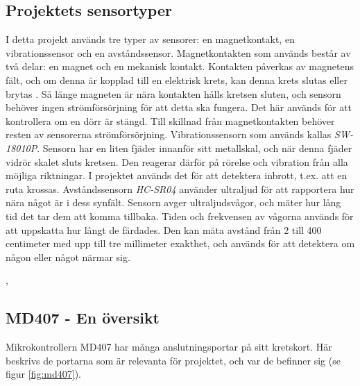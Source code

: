 \subsection{Projektets sensortyper}
\label{sec:sensortyper}
I detta projekt används tre typer av sensorer: en magnetkontakt, en vibrationssensor och en avståndssensor. Magnetkontakten som används består av två delar: en magnet och en mekanisk kontakt. Kontakten påverkas av magnetens fält, och om denna är kopplad till en elektrisk krets, kan denna krets slutas eller brytas \cite[s. 15]{lundh:2008}. Så länge magneten är nära kontakten hålls kretsen sluten, och sensorn behöver ingen strömförsörjning för att detta ska fungera. Det här används för att kontrollera om en dörr är stängd. 
\newline \newline
Till skillnad från magnetkontakten behöver resten av sensorerna strömförsörjning.
Vibrationssensorn som används kallas \textit{SW-18010P}. Sensorn har en liten fjäder innanför sitt metallskal, och när denna fjäder vidrör skalet sluts kretsen. Den reagerar därför på rörelse och vibration från alla möjliga riktningar. I projektet används det för att detektera inbrott, t.ex. att en ruta krossas.
Avståndssensorn \textit{HC-SR04} använder ultraljud för att rapportera hur nära något är i dess synfält. Sensorn avger ultraljudsvågor, och mäter hur lång tid det tar dem att komma tillbaka. Tiden och frekvensen av vågorna används för att uppskatta hur långt de färdades. Den kan mäta avstånd från 2 till 400 centimeter med upp till tre millimeter exakthet, och används för att detektera om någon eller något närmar sig. 
\begin{flushright} 
\cite{elecfreaks} , \cite{bailing:2011}
\end{flushright}



\newpage
\subsection{MD407 - En översikt}
\label{sec:md407}
Mikrokontrollern MD407 har många anslutningsportar på sitt kretskort. Här beskrivs de portarna som är relevanta för projektet, och var de befinner sig (se figur \ref{fig:md407}).

